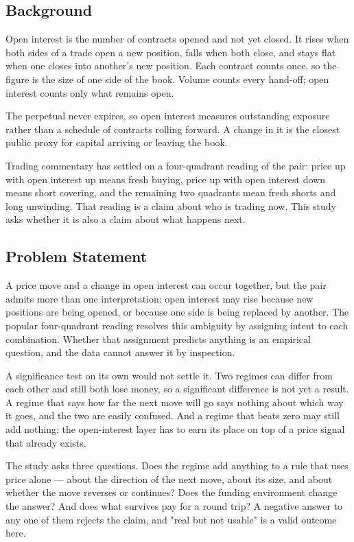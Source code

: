 \documentclass[11pt,a4paper]{article}
\begin{document}
\subsection{Background}

Open interest is the number of contracts opened and not yet closed. It rises when both sides of a trade open a new position, falls when both close, and stays flat when one closes into another's new position. Each contract counts once, so the figure is the size of one side of the book. Volume counts every hand-off; open interest counts only what remains open.

The perpetual never expires, so open interest measures outstanding exposure rather than a schedule of contracts rolling forward. A change in it is the closest public proxy for capital arriving or leaving the book.

Trading commentary has settled on a four-quadrant reading of the pair: price up with open interest up means fresh buying, price up with open interest down means short covering, and the remaining two quadrants mean fresh shorts and long unwinding. That reading is a claim about who is trading now. This study asks whether it is also a claim about what happens next.

\subsection{Problem Statement}

A price move and a change in open interest can occur together, but the pair admits more than one interpretation: open interest may rise because new positions are being opened, or because one side is being replaced by another. The popular four-quadrant reading resolves this ambiguity by assigning intent to each combination. Whether that assignment predicts anything is an empirical question, and the data cannot answer it by inspection.

A significance test on its own would not settle it. Two regimes can differ from each other and still both lose money, so a significant difference is not yet a result. A regime that says how far the next move will go says nothing about which way it goes, and the two are easily confused. And a regime that beats zero may still add nothing: the open-interest layer has to earn its place on top of a price signal that already exists.

The study asks three questions. Does the regime add anything to a rule that uses price alone --- about the direction of the next move, about its size, and about whether the move reverses or continues? Does the funding environment change the answer? And does what survives pay for a round trip? A negative answer to any one of them rejects the claim, and "real but not usable" is a valid outcome here.
\end{document}
